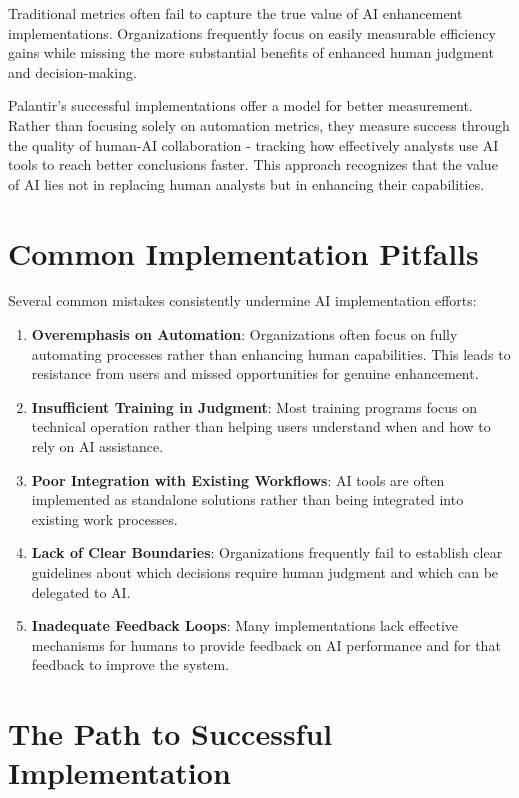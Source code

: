 \documentclass[
  Letterpaper,
]{scrbook}
\begin{document}
Traditional metrics often fail to capture the true value of AI
enhancement implementations. Organizations frequently focus on easily
measurable efficiency gains while missing the more substantial benefits
of enhanced human judgment and decision-making.

Palantir's successful implementations offer a model for better
measurement. Rather than focusing solely on automation metrics, they
measure success through the quality of human-AI collaboration - tracking
how effectively analysts use AI tools to reach better conclusions
faster. This approach recognizes that the value of AI lies not in
replacing human analysts but in enhancing their capabilities.

\section{Common Implementation
Pitfalls}\label{common-implementation-pitfalls}

Several common mistakes consistently undermine AI implementation
efforts:

\begin{enumerate}
\def\labelenumi{\arabic{enumi}.}
\item
  \textbf{Overemphasis on Automation}: Organizations often focus on
  fully automating processes rather than enhancing human capabilities.
  This leads to resistance from users and missed opportunities for
  genuine enhancement.
\item
  \textbf{Insufficient Training in Judgment}: Most training programs
  focus on technical operation rather than helping users understand when
  and how to rely on AI assistance.
\item
  \textbf{Poor Integration with Existing Workflows}: AI tools are often
  implemented as standalone solutions rather than being integrated into
  existing work processes.
\item
  \textbf{Lack of Clear Boundaries}: Organizations frequently fail to
  establish clear guidelines about which decisions require human
  judgment and which can be delegated to AI.
\item
  \textbf{Inadequate Feedback Loops}: Many implementations lack
  effective mechanisms for humans to provide feedback on AI performance
  and for that feedback to improve the system.
\end{enumerate}

\section{The Path to Successful
Implementation}\label{the-path-to-successful-implementation}
\end{document}
